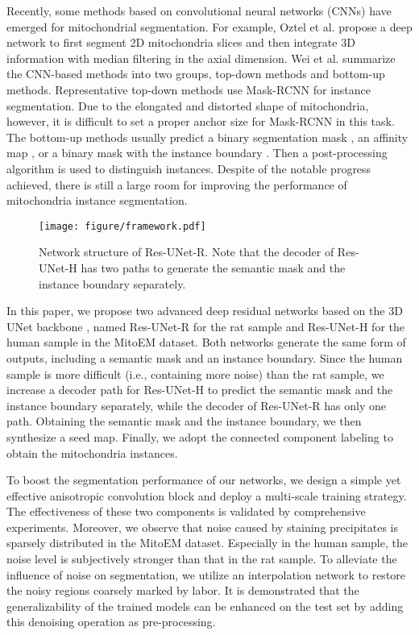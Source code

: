 \documentclass{article}
\begin{document}
Recently, some methods based on convolutional neural networks (CNNs) have emerged for mitochondrial segmentation.
For example, Oztel et al. \cite{oztel2017mitochondria} propose a deep network to first segment 2D mitochondria slices and then integrate 3D information with median filtering in the axial dimension.
Wei et al. \cite{wei2020mitoem} summarize the CNN-based methods  into two groups, top-down methods and bottom-up methods. Representative top-down methods use Mask-RCNN \cite{he2017mask} for instance segmentation. Due to the elongated and distorted shape of mitochondria, however, it is difficult to set a proper anchor size for Mask-RCNN in this task.
The bottom-up methods usually predict a binary segmentation mask \cite{ronneberger2015u}, an affinity map \cite{lee2017superhuman}, or a binary mask  with the instance boundary \cite{chen2016dcan}. Then a post-processing algorithm is used to distinguish instances. Despite of the notable progress achieved, there is still a large room for improving the performance of mitochondria instance segmentation.



\begin{figure*}[t]
	\centering
	\texttt{[image: figure/framework.pdf]} \caption{Network structure of Res-UNet-R. Note that the decoder of Res-UNet-H has two paths to generate the semantic mask and the instance boundary separately.}
	\label{fig:framework}
\end{figure*}

In this paper, we propose two advanced deep residual networks based on the 3D UNet backbone \cite{cciccek20163d}, named Res-UNet-R for the rat sample and Res-UNet-H for the human sample in the MitoEM dataset. Both networks generate the same form of outputs, including a semantic mask and an instance boundary. Since the human sample is more difficult (i.e., containing more noise) than the rat sample, we increase a decoder path for Res-UNet-H to predict the semantic mask and the instance boundary separately, while the decoder of Res-UNet-R has only one path. Obtaining the semantic mask and the instance boundary, we then synthesize a seed map. Finally, we adopt the connected component labeling    to obtain the mitochondria instances.

To boost the segmentation performance of our networks, we design a simple yet effective anisotropic convolution block and deploy a multi-scale training strategy. The effectiveness of these two components is validated by comprehensive experiments. Moreover, we observe that noise caused by staining precipitates is sparsely distributed in the MitoEM dataset. Especially in the human sample, the noise level is subjectively stronger than that in the rat sample. To alleviate the influence of noise on segmentation, we utilize an interpolation network \cite{niklaus2017video,huang2020learning} to restore the noisy regions coarsely marked by labor. It is demonstrated that the generalizability of the trained models can be enhanced on the test set by adding this denoising operation as pre-processing.
\vspace{-0.5cm}
\end{document}
